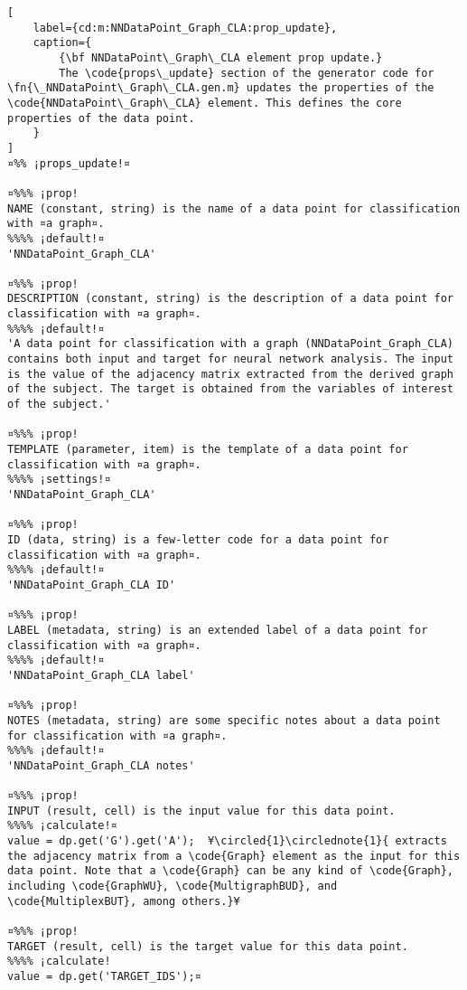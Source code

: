 \documentclass{tufte-handout}
\begin{document}
\begin{lstlisting}[
	label={cd:m:NNDataPoint_Graph_CLA:prop_update},
	caption={
		{\bf NNDataPoint\_Graph\_CLA element prop update.}
		The \code{props\_update} section of the generator code for \fn{\_NNDataPoint\_Graph\_CLA.gen.m} updates the properties of the \code{NNDataPoint\_Graph\_CLA} element. This defines the core properties of the data point.
	}
]
¤%% ¡props_update!¤

¤%%% ¡prop!
NAME (constant, string) is the name of a data point for classification with ¤a graph¤.
%%%% ¡default!¤
'NNDataPoint_Graph_CLA'

¤%%% ¡prop!
DESCRIPTION (constant, string) is the description of a data point for classification with ¤a graph¤.
%%%% ¡default!¤
'A data point for classification with a graph (NNDataPoint_Graph_CLA) contains both input and target for neural network analysis. The input is the value of the adjacency matrix extracted from the derived graph of the subject. The target is obtained from the variables of interest of the subject.'

¤%%% ¡prop!
TEMPLATE (parameter, item) is the template of a data point for classification with ¤a graph¤.
%%%% ¡settings!¤
'NNDataPoint_Graph_CLA'

¤%%% ¡prop!
ID (data, string) is a few-letter code for a data point for classification with ¤a graph¤.
%%%% ¡default!¤
'NNDataPoint_Graph_CLA ID'

¤%%% ¡prop!
LABEL (metadata, string) is an extended label of a data point for classification with ¤a graph¤.
%%%% ¡default!¤
'NNDataPoint_Graph_CLA label'

¤%%% ¡prop!
NOTES (metadata, string) are some specific notes about a data point for classification with ¤a graph¤.
%%%% ¡default!¤
'NNDataPoint_Graph_CLA notes'

¤%%% ¡prop!
INPUT (result, cell) is the input value for this data point.
%%%% ¡calculate!¤
value = dp.get('G').get('A');  ¥\circled{1}\circlednote{1}{ extracts the adjacency matrix from a \code{Graph} element as the input for this data point. Note that a \code{Graph} can be any kind of \code{Graph}, including \code{GraphWU}, \code{MultigraphBUD}, and \code{MultiplexBUT}, among others.}¥
    
¤%%% ¡prop!
TARGET (result, cell) is the target value for this data point.
%%%% ¡calculate!
value = dp.get('TARGET_IDS');¤

\end{lstlisting}
\end{document}
